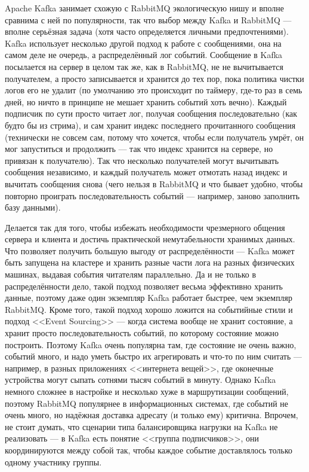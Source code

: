 \documentclass{../../text-style}
\begin{document}
Apache Kafka занимает схожую с RabbitMQ экологическую нишу и вполне сравнима с ней по популярности, так что выбор между Kafka и RabbitMQ --- вполне серьёзная задача (хотя часто определяется личными предпочтениями). Kafka использует несколько другой подход к работе с сообщениями, она на самом деле не очередь, а распределённый лог событий. Сообщение в Kafka посылается на сервер в целом так же, как в RabbitMQ, не не вычитывается получателем, а просто записывается и хранится до тех пор, пока политика чистки логов его не удалит (по умолчанию это происходит по таймеру, где-то раз в семь дней, но ничто в принципе не мешает хранить событий хоть вечно). Каждый подписчик по сути просто читает лог, получая сообщения последовательно (как будто бы из стрима), и сам хранит индекс последнего прочитанного сообщения (технически не совсем сам, потому что хочется, чтобы если получатель умрёт, он мог запуститься и продолжить --- так что индекс хранится на сервере, но привязан к получателю). Так что несколько получателей могут вычитывать сообщения независимо, и каждый получатель может отмотать назад индекс и вычитать сообщения снова (чего нельзя в RabbitMQ и что бывает удобно, чтобы повторно проиграть последовательность событий --- например, заново заполнить базу данными).

Делается так для того, чтобы избежать необходимости чрезмерного общения сервера и клиента и достичь практической немутабельности хранимых данных. Что позволяет получить большую выгоду от распределённости --- Kafka может быть запущена на кластере и хранить разные части лога на разных физических машинах, выдавая события читателям параллельно. Да и не только в распределённости дело, такой подход позволяет весьма эффективно хранить данные, поэтому даже один экземпляр Kafka работает быстрее, чем экземпляр RabbitMQ. Кроме того, такой подход хорошо ложится на событийные стили и подход <<Event Sourcing>> --- когда система вообще не хранит состояние, а хранит просто последовательность событий, по которому состояние можно построить. Поэтому Kafka очень популярна там, где состояние не очень важно, событий много, и надо уметь быстро их агрегировать и что-то по ним считать --- например, в разных приложениях <<интернета вещей>>, где оконечные устройства могут сыпать сотнями тысяч событий в минуту. Однако Kafka немного сложнее в настройке и несколько хуже в маршрутизации сообщений, поэтому RabbitMQ популярнее в информационных системах, где событий не очень много, но надёжная доставка адресату (и только ему) критична. Впрочем, не стоит думать, что сценарии типа балансировщика нагрузки на Kafka не реализовать --- в Kafka есть понятие <<группа подписчиков>>, они координируются между собой так, чтобы каждое событие доставлялось только одному участнику группы.
\end{document}
